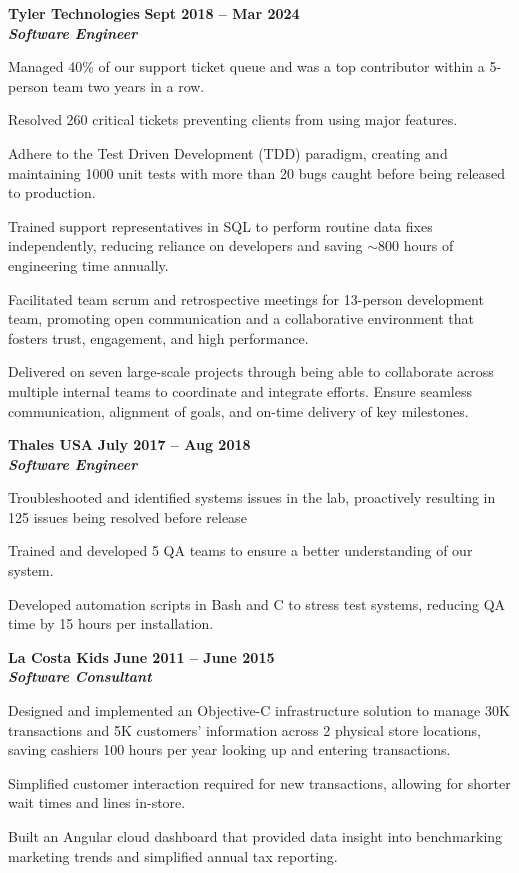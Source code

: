 \documentclass[10pt]{article}
\newcommand{\thing}[1][]{\item #1}
\newcommand{\dates}[2]{
    \textbf{#1 -- #2}
}
\newcommand{\+}{\raisebox{0.2ex}{+}} %
\newcommand{\gt}{\raisebox{0.1ex}{\textgreater}} %
\begin{document}
    \textbf{\large Tyler Technologies} \hfill \dates{Sept 2018}{Mar 2024}\\
    \textit{\textbf{Software Engineer}}
    \begin{things}
        \thing Managed \gt40\% of our support ticket queue and was a top contributor
                    within a 5-person team two years in a row.
        \thing Resolved 260 critical tickets preventing clients from using major features.
        \thing Adhere to the Test Driven Development (TDD) paradigm,
                    creating and maintaining \gt1000 unit tests with
                    more than 20 bugs caught before being released to production.
        \thing Trained support representatives in SQL to perform routine
                    data fixes independently, reducing reliance on developers
                    and saving $\sim$800 hours of engineering time annually.
        \thing Facilitated team scrum and retrospective meetings for 13-person
                development team, promoting open communication and a collaborative 
                environment that fosters trust, engagement, and high performance.
        \thing Delivered on seven large-scale projects through being able to collaborate across
                    multiple internal teams to coordinate and integrate efforts.
                    Ensure seamless communication, alignment of goals,
                    and on-time delivery of key milestones.
    \end{things}

    \textbf{\large Thales USA} \hfill \dates{July 2017}{Aug 2018}\\
    \textit{\textbf{Software Engineer}}
    \begin{things}
        \thing Troubleshooted and identified systems issues in 
                    the lab, proactively resulting in \gt125 issues being resolved before release
        \thing Trained and developed 5 QA teams to ensure a better understanding of our system.
        \thing Developed automation scripts in Bash and C\+\+ to stress test systems, reducing
                    QA time by 15 hours per installation.
    \end{things}

    \textbf{\large La Costa Kids} \hfill \dates{June 2011}{June 2015}\\
    \textit{\textbf{Software Consultant}}
    \begin{things}
        \thing Designed and implemented an Objective-C infrastructure solution to
                manage \gt30K transactions and \gt5K customers' information
                across 2 physical store locations, saving cashiers
                \gt100 hours per year looking up and entering transactions.
        \thing Simplified customer interaction required for new transactions,
                allowing for shorter wait times and lines in-store.
        \thing Built an Angular cloud dashboard that provided data insight
                into benchmarking marketing trends and simplified annual tax reporting.
    \end{things}
\end{document}
